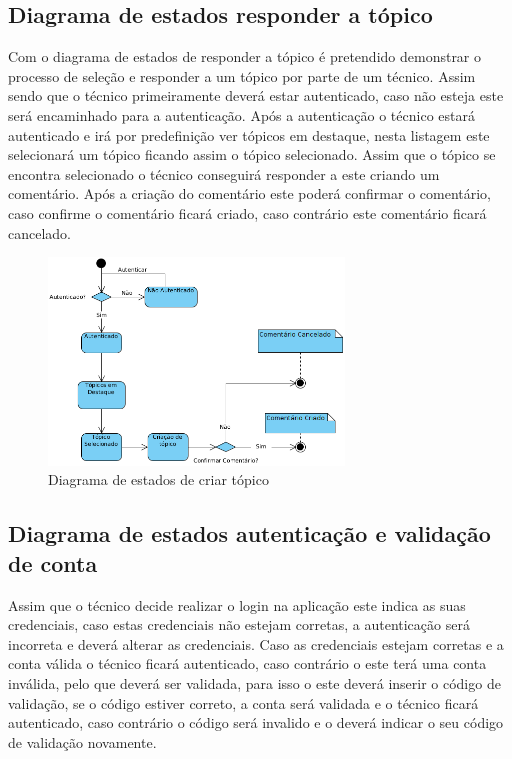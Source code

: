 \subsection{Diagrama de estados responder a tópico}

Com o diagrama de estados de responder a tópico é pretendido demonstrar o processo de seleção e 
responder a um tópico por parte de um técnico. Assim sendo que o técnico primeiramente deverá estar 
autenticado, caso não esteja este será encaminhado para a autenticação. Após a autenticação o técnico 
estará autenticado e irá por predefinição ver tópicos em destaque, nesta listagem este selecionará um 
tópico ficando assim o tópico 
selecionado. Assim que o tópico se encontra selecionado o técnico conseguirá responder a este criando 
um comentário. Após a criação do comentário este poderá confirmar o comentário, caso confirme o 
comentário ficará criado, caso contrário este comentário ficará cancelado.

\begin{figure}[htb]
    \centering
    \includegraphics[width=0.7\textwidth]{images/diagramas/estados/responder_topico_tecnico.png}
    \caption{Diagrama de estados de criar tópico}
    \label{fig:41}
\end{figure}

\newpage

\subsection{Diagrama de estados autenticação e validação de conta}

Assim que o técnico decide realizar o login na aplicação este indica as suas credenciais, caso estas 
credenciais não estejam corretas, a autenticação será incorreta e deverá alterar as credenciais. 
Caso as credenciais estejam corretas e a conta válida o técnico ficará autenticado, caso contrário o 
este terá uma conta inválida, pelo que deverá ser validada, para  isso o este deverá 
inserir o código de validação, se o código estiver correto, a conta será validada e o técnico 
ficará autenticado, caso contrário o código será invalido e o deverá indicar o seu código de 
validação novamente.

